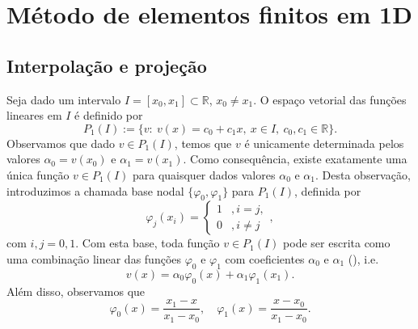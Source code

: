 
\chapter{Método de elementos finitos em 1D}\label{cap_mef1d}
\thispagestyle{fancy}

\section{Interpolação e projeção}\label{cap_mef1d_sec_interproj}

Seja dado um intervalo $I = [x_0, x_1]\subset\mathbb{R}$, $x_0\neq x_1$. O espaço vetorial das funções lineares em $I$ é definido por
\begin{equation}
  P_1(I) := \{v:~v(x)=c_0+c_1x,~x\in I,~c_0,c_1\in\mathbb{R}\}.
\end{equation}
Observamos que dado $v\in P_1(I)$, temos que $v$ é unicamente determinada pelos valores $\alpha_0=v(x_0)$ e $\alpha_1=v(x_1)$. Como consequência, existe exatamente uma única função $v\in P_1(I)$ para quaisquer dados valores $\alpha_0$ e $\alpha_1$. Desta observação, introduzimos a chamada base nodal $\{\varphi_0, \varphi_1\}$ para $P_1(I)$, definida por
\begin{equation}
  \varphi_j(x_i) = \left\{
    \begin{array}{ll}
      1 &, i=j,\\
      0 &, i\neq j
    \end{array}
\right.,
\end{equation}
com $i,j=0,1$. Com esta base, toda função $v\in P_1(I)$ pode ser escrita como uma combinação linear das funções $\varphi_0$ e $\varphi_1$ com coeficientes $\alpha_0$ e $\alpha_1$ (), i.e.
\begin{equation}
  v(x) = \alpha_0\varphi_0(x) + \alpha_1\varphi_1(x_1).
\end{equation}
Além disso, observamos que
\begin{equation}
  \varphi_0(x) = \frac{x_1-x}{x_1-x_0},\quad \varphi_1(x)=\frac{x-x_0}{x_1-x_0}.
\end{equation}

